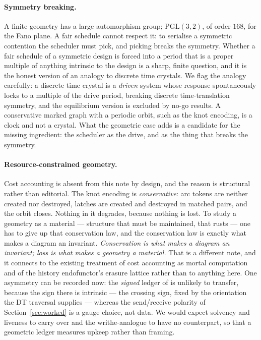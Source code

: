 \documentclass[11pt]{article}
\theoremstyle{plain}
\theoremstyle{definition}
\theoremstyle{remark}
\begin{document}
\paragraph{Symmetry breaking.} A finite geometry has a large automorphism group;
$\mathrm{PGL}(3,2)$, of order $168$, for the Fano plane. A fair schedule cannot respect it:
to serialise a symmetric contention the scheduler must pick, and picking breaks the
symmetry. Whether a fair schedule of a symmetric design is forced into a period that is a
proper multiple of anything intrinsic to the design is a sharp, finite question, and it is
the honest version of an analogy to discrete time crystals. We flag the analogy carefully:
a discrete time crystal is a \emph{driven} system whose response spontaneously locks to a
multiple of the drive period, breaking discrete time-translation symmetry, and the
equilibrium version is excluded by no-go results. A conservative marked graph with a
periodic orbit, such as the knot encoding, is a clock and not a crystal. What the geometric
case adds is a candidate for the missing ingredient: the scheduler as the drive, and as the
thing that breaks the symmetry.

\paragraph{Resource-constrained geometry.} Cost accounting is absent from this note by
design, and the reason is structural rather than editorial. The knot encoding is
\emph{conservative}: arc tokens are neither created nor destroyed, latches are created and
destroyed in matched pairs, and the orbit closes. Nothing in it degrades, because nothing
is lost. To study a geometry as a material --- structure that must be maintained, that
rusts --- one has to give up that conservation law, and the conservation law is exactly
what makes a diagram an invariant. \emph{Conservation is what makes a diagram an invariant;
loss is what makes a geometry a material.} That is a different note, and it connects to the
existing treatment of cost accounting as mortal computation and of the history endofunctor's
erasure lattice rather than to anything here. One asymmetry can be recorded now: the
\emph{signed} ledger of \cite{KnotsNote} is unlikely to transfer, because the sign there is
intrinsic --- the crossing sign, fixed by the orientation the DT traversal supplies ---
whereas the send/receive polarity of Section~\ref{sec:worked} is a gauge choice, not data.
We would expect solvency and liveness to carry over and the writhe-analogue to have no
counterpart, so that a geometric ledger measures upkeep rather than framing.
\end{document}
